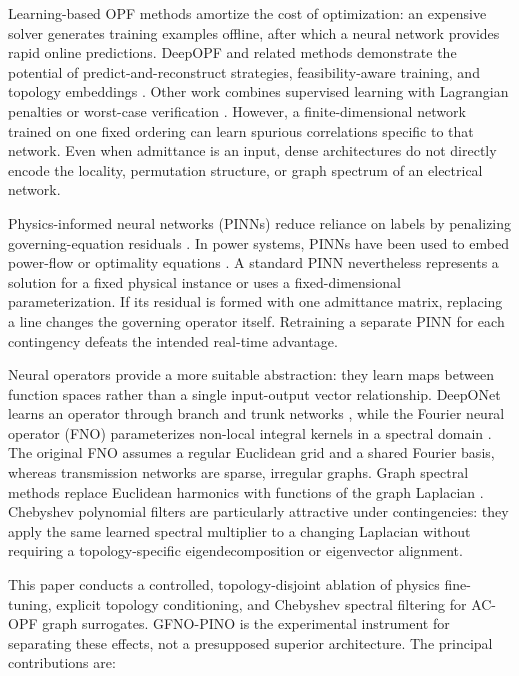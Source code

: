 \documentclass[final,5p,times,twocolumn]{elsarticle}
\begin{document}
Learning-based OPF methods amortize the cost of optimization: an expensive
solver generates training examples offline, after which a neural network
provides rapid online predictions. DeepOPF and related methods demonstrate the
potential of predict-and-reconstruct strategies, feasibility-aware training,
and topology embeddings
\cite{pan2021deepopf,pan2023acdeepopf,zhou2023deepopfft}.
Other work combines supervised learning with Lagrangian penalties or
worst-case verification \cite{fioretto2020predicting,venzke2020worstcase}.
However, a finite-dimensional network trained on one fixed ordering can learn
spurious correlations specific to that network. Even when admittance is an
input, dense architectures do not directly encode the locality, permutation
structure, or graph spectrum of an electrical network.

Physics-informed neural networks (PINNs) reduce reliance on labels by penalizing
governing-equation residuals \cite{raissi2019pinn,karniadakis2021piml}. In power
systems, PINNs have been used to embed power-flow or optimality equations
\cite{misyris2020pinn,nellikkath2022acopf,lei2021datadriven}. A standard PINN
nevertheless represents a solution for a fixed physical instance or uses a
fixed-dimensional parameterization. If its residual is formed with one
admittance matrix, replacing a line changes the governing operator itself.
Retraining a separate PINN for each contingency defeats the intended real-time
advantage.

Neural operators provide a more suitable abstraction: they learn maps between
function spaces rather than a single input-output vector relationship.
DeepONet learns an operator through branch and trunk networks
\cite{lu2021deeponet}, while the Fourier neural operator (FNO) parameterizes
non-local integral kernels in a spectral domain \cite{li2021fno,kova2023neuralop}.
The original FNO assumes a regular Euclidean grid and a shared Fourier basis,
whereas transmission networks are sparse, irregular graphs. Graph spectral
methods replace Euclidean harmonics with functions of the graph Laplacian
\cite{hammond2011wavelets,defferrard2016chebnet,bronstein2017geometric}.
Chebyshev polynomial filters are particularly attractive under contingencies:
they apply the same learned spectral multiplier to a changing Laplacian without
requiring a topology-specific eigendecomposition or eigenvector alignment.

This paper conducts a controlled, topology-disjoint ablation of physics
fine-tuning, explicit topology conditioning, and Chebyshev spectral filtering
for AC-OPF graph surrogates. GFNO-PINO is the experimental instrument for
separating these effects, not a presupposed superior architecture. The
principal contributions are:
\end{document}
